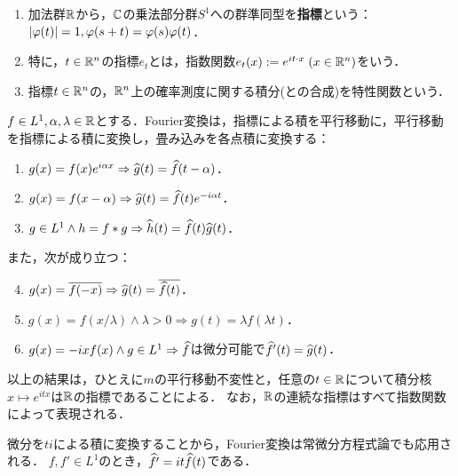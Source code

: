 \documentclass[uplatex,dvipdfmx]{jsreport}
\begin{document}
\begin{definition}\mbox{}
    \begin{enumerate}
        \item 加法群$\mathbb{R}$から，$\mathbb{C}$の乗法部分群$S^1$への群準同型を\textbf{指標}という：$\lvert\varphi(t)\rvert=1,\varphi(s+t)=\varphi(s)\varphi(t)$．
        \item 特に，$t\in\mathbb{R}^n$の指標$e_t$とは，指数関数$e_t(x):=e^{it\cdot x}\;(x\in\mathbb{R}^n)$をいう．
        \item 指標$t\in\mathbb{R}^n$の，$\mathbb{R}^n$上の確率測度に関する積分(との合成)を特性関数という．
    \end{enumerate}
\end{definition}

\begin{theorem}[Fourier変換の関手性]
    $f\in L^1,\alpha,\lambda\in\mathbb{R}$とする．Fourier変換は，指標による積を平行移動に，平行移動を指標による積に変換し，畳み込みを各点積に変換する：
    \begin{enumerate}
        \item $g(x)=f(x)e^{i\alpha x}\Rightarrow\widehat{g}(t)=\widehat{f}(t-\alpha)$．
        \item $g(x)=f(x-\alpha)\Rightarrow\widehat{g}(t)=\widehat{f}(t)e^{-i\alpha t}$．
        \item $g\in L^1\land h=f*g\Rightarrow\widehat{h}(t)=\widehat{f}(t)\widehat{g}(t)$．
    \end{enumerate}
    また，次が成り立つ：
    \begin{enumerate}\setcounter{enumi}{3}
        \item $g(x)=\overline{f(-x)}\Rightarrow\widehat{g}(t)=\overline{\widehat{f}(t)}$．
        \item $g(x)=f(x/\lambda)\land\lambda>0\Rightarrow g(t)=\lambda f(\lambda t)$．
        \item $g(x)=-ixf(x)\land g\in L^1\Rightarrow\widehat{f}$は微分可能で$\widehat{f}'(t)=\widehat{g}(t)$．
    \end{enumerate}
\end{theorem}
\begin{remarks}
    以上の結果は，ひとえに$m$の平行移動不変性と，任意の$t\in\mathbb{R}$について積分核$x\mapsto e^{itx}$は$\mathbb{R}$の指標であることによる．
    なお，$\mathbb{R}$の連続な指標はすべて指数関数によって表現される．
\end{remarks}

\begin{remark}[(6)の逆]
    微分を$ti$による積に変換することから，Fourier変換は常微分方程式論でも応用される．
    $f,f'\in L^1$のとき，$\widehat{f'}=it\widehat{f}(t)$である．
\end{remark}
\end{document}
